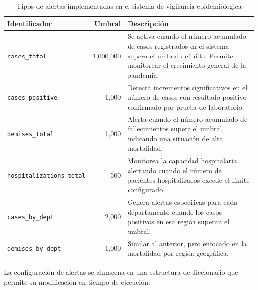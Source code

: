 \documentclass[12pt,a4paper]{article}
\begin{document}
\begin{table}[H]
    \centering
    \caption{Tipos de alertas implementadas en el sistema de vigilancia epidemiológica}
    \label{tab:tipos-alertas}
    \small
    \begin{tabularx}{\textwidth}{@{}lrX@{}}
        \toprule
        \textbf{Identificador}           & \textbf{Umbral} & \textbf{Descripción}                                                                                    \\
        \midrule
        \texttt{cases\_total}            & 1,000,000       &
        Se activa cuando el número acumulado de casos registrados en el sistema supera el umbral definido. Permite monitorear el crecimiento general de la pandemia. \\
        \addlinespace
        \texttt{cases\_positive}         & 1,000           &
        Detecta incrementos significativos en el número de casos con resultado positivo confirmado por prueba de laboratorio.                                        \\
        \addlinespace
        \texttt{demises\_total}          & 1,000           &
        Alerta cuando el número acumulado de fallecimientos supera el umbral, indicando una situación de alta mortalidad.                                            \\
        \addlinespace
        \texttt{hospitalizations\_total} & 500             &
        Monitorea la capacidad hospitalaria alertando cuando el número de pacientes hospitalizados excede el límite configurado.                                     \\
        \addlinespace
        \texttt{cases\_by\_dept}         & 2,000           &
        Genera alertas específicas para cada departamento cuando los casos positivos en esa región superan el umbral.                                                \\
        \addlinespace
        \texttt{demises\_by\_dept}       & 1,000           &
        Similar al anterior, pero enfocado en la mortalidad por región geográfica.                                                                                   \\
        \bottomrule
    \end{tabularx}
\end{table}

La configuración de alertas se almacena en una estructura de diccionario que permite su modificación en tiempo de ejecución:
\end{document}
